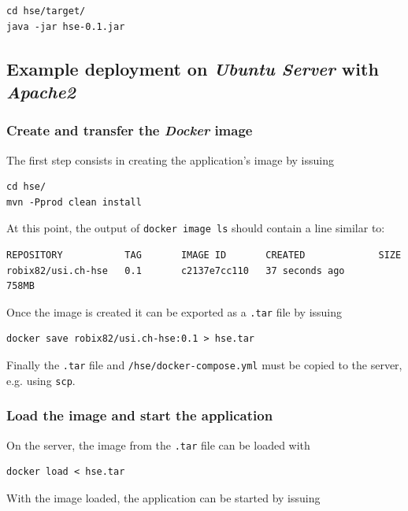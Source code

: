 \documentclass[fleqn]{article}
\begin{document}
\begin{verbatim}
cd hse/target/
java -jar hse-0.1.jar
\end{verbatim}

\subsection{Example deployment on \emph{Ubuntu Server} with \emph{Apache2}}

\subsubsection{Create and transfer the \emph{Docker} image}

The first step consists in creating the application's image by issuing

\begin{verbatim}
cd hse/
mvn -Pprod clean install
\end{verbatim}

At this point, the output of \texttt{docker image ls} should contain a line similar to:

\begin{verbatim}
REPOSITORY           TAG       IMAGE ID       CREATED             SIZE
robix82/usi.ch-hse   0.1       c2137e7cc110   37 seconds ago      758MB
\end{verbatim}

Once the image is created it can be exported as a \texttt{.tar} file by issuing

\begin{verbatim}
docker save robix82/usi.ch-hse:0.1 > hse.tar
\end{verbatim}

Finally the \texttt{.tar} file and \texttt{/hse/docker-compose.yml} must be copied to the server, e.g. using \texttt{scp}.

\subsubsection{Load the image and start the application}

On the server, the image from the \texttt{.tar} file can be loaded with

\begin{verbatim}
docker load < hse.tar
\end{verbatim}

With the image loaded, the application can be started by issuing
\end{document}
